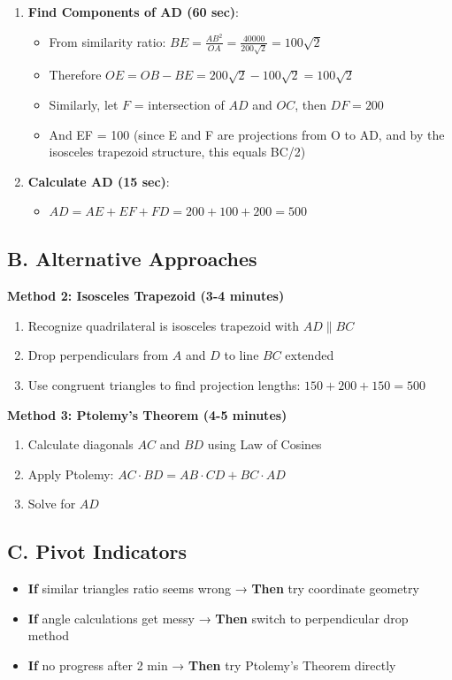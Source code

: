 \documentclass[12pt]{article}
\begin{document}
\begin{roadmapbox}
\begin{enumerate}[leftmargin=*]
    \item \textbf{Find Components of AD (60 sec)}:
    \begin{itemize}
        \item From similarity ratio: $BE = \frac{AB^2}{OA} = \frac{40000}{200\sqrt{2}} = 100\sqrt{2}$
        \item Therefore $OE = OB - BE = 200\sqrt{2} - 100\sqrt{2} = 100\sqrt{2}$
        \item Similarly, let $F$ = intersection of $AD$ and $OC$, then $DF = 200$
        \item And EF = 100 (since E and F are projections from O to AD, and by the isosceles trapezoid structure, this equals BC/2)
    \end{itemize}
    
    \item \textbf{Calculate AD (15 sec)}:
    \begin{itemize}
        \item $AD = AE + EF + FD = 200 + 100 + 200 = \boxed{500}$
    \end{itemize}
\end{enumerate}

\subsection*{B. Alternative Approaches}

\textbf{Method 2: Isosceles Trapezoid (3-4 minutes)}
\begin{enumerate}[leftmargin=*]
    \item Recognize quadrilateral is isosceles trapezoid with $AD \parallel BC$
    \item Drop perpendiculars from $A$ and $D$ to line $BC$ extended
    \item Use congruent triangles to find projection lengths: $150 + 200 + 150 = 500$
\end{enumerate}

\textbf{Method 3: Ptolemy's Theorem (4-5 minutes)}
\begin{enumerate}[leftmargin=*]
    \item Calculate diagonals $AC$ and $BD$ using Law of Cosines
    \item Apply Ptolemy: $AC \cdot BD = AB \cdot CD + BC \cdot AD$
    \item Solve for $AD$
\end{enumerate}

\subsection*{C. Pivot Indicators}
\begin{itemize}[leftmargin=*]
    \item \textbf{If} similar triangles ratio seems wrong → \textbf{Then} try coordinate geometry
    \item \textbf{If} angle calculations get messy → \textbf{Then} switch to perpendicular drop method
    \item \textbf{If} no progress after 2 min → \textbf{Then} try Ptolemy's Theorem directly
\end{itemize}


\end{roadmapbox}
\end{document}
